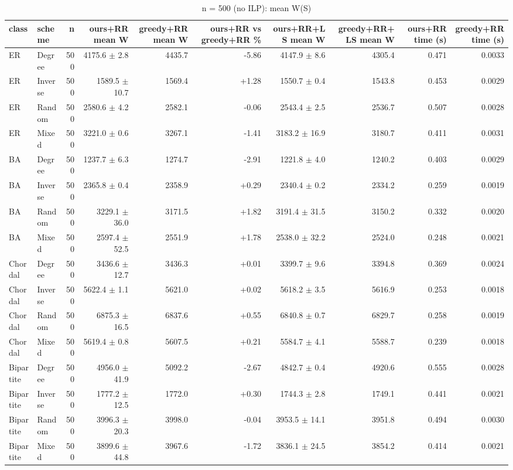 \begin{table}[t]
\centering
\small
\caption{n = 500 (no ILP): mean W(S)}
\begin{tabular}{llrrrrrrrr}
\toprule
class & scheme & n & ours+RR mean W & greedy+RR mean W & ours+RR vs greedy+RR \% & ours+RR+LS mean W & greedy+RR+LS mean W & ours+RR time (s) & greedy+RR time (s) \\
\midrule
ER & Degree & 500 & 4175.6 $\pm$ 2.8 & 4435.7 & -5.86 & 4147.9 $\pm$ 8.6 & 4305.4 & 0.471 & 0.0033 \\
ER & Inverse & 500 & 1589.5 $\pm$ 10.7 & 1569.4 & +1.28 & 1550.7 $\pm$ 0.4 & 1543.8 & 0.453 & 0.0029 \\
ER & Random & 500 & 2580.6 $\pm$ 4.2 & 2582.1 & -0.06 & 2543.4 $\pm$ 2.5 & 2536.7 & 0.507 & 0.0028 \\
ER & Mixed & 500 & 3221.0 $\pm$ 0.6 & 3267.1 & -1.41 & 3183.2 $\pm$ 16.9 & 3180.7 & 0.411 & 0.0031 \\
BA & Degree & 500 & 1237.7 $\pm$ 6.3 & 1274.7 & -2.91 & 1221.8 $\pm$ 4.0 & 1240.2 & 0.403 & 0.0029 \\
BA & Inverse & 500 & 2365.8 $\pm$ 0.4 & 2358.9 & +0.29 & 2340.4 $\pm$ 0.2 & 2334.2 & 0.259 & 0.0019 \\
BA & Random & 500 & 3229.1 $\pm$ 36.0 & 3171.5 & +1.82 & 3191.4 $\pm$ 31.5 & 3150.2 & 0.332 & 0.0020 \\
BA & Mixed & 500 & 2597.4 $\pm$ 52.5 & 2551.9 & +1.78 & 2538.0 $\pm$ 32.2 & 2524.0 & 0.248 & 0.0021 \\
Chordal & Degree & 500 & 3436.6 $\pm$ 12.7 & 3436.3 & +0.01 & 3399.7 $\pm$ 9.6 & 3394.8 & 0.369 & 0.0024 \\
Chordal & Inverse & 500 & 5622.4 $\pm$ 1.1 & 5621.0 & +0.02 & 5618.2 $\pm$ 3.5 & 5616.9 & 0.253 & 0.0018 \\
Chordal & Random & 500 & 6875.3 $\pm$ 16.5 & 6837.6 & +0.55 & 6840.8 $\pm$ 0.7 & 6829.7 & 0.258 & 0.0019 \\
Chordal & Mixed & 500 & 5619.4 $\pm$ 0.8 & 5607.5 & +0.21 & 5584.7 $\pm$ 4.1 & 5588.7 & 0.239 & 0.0018 \\
Bipartite & Degree & 500 & 4956.0 $\pm$ 41.9 & 5092.2 & -2.67 & 4842.7 $\pm$ 0.4 & 4920.6 & 0.555 & 0.0028 \\
Bipartite & Inverse & 500 & 1777.2 $\pm$ 12.5 & 1772.0 & +0.30 & 1744.3 $\pm$ 2.8 & 1749.1 & 0.441 & 0.0021 \\
Bipartite & Random & 500 & 3996.3 $\pm$ 20.3 & 3998.0 & -0.04 & 3953.5 $\pm$ 14.1 & 3951.8 & 0.494 & 0.0030 \\
Bipartite & Mixed & 500 & 3899.6 $\pm$ 44.8 & 3967.6 & -1.72 & 3836.1 $\pm$ 24.5 & 3854.2 & 0.414 & 0.0021 \\
\bottomrule
\end{tabular}
\end{table}
